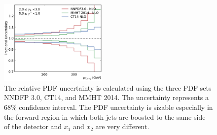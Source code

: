 \begin{figure}[htp]
    \includegraphics[width=0.47\textwidth]{figures/theory/pdf_unc_comparison_yb2ys0.pdf}
    \caption[PDF uncertainty]{The relative PDF uncertainty is calculated using the three PDF sets
    NNDFP 3.0, CT14, and MMHT 2014. The uncertainty represents a 68\% confidence
    interval. The PDF uncertainty is sizable especially in the forward region in
    which both jets  are boosted to the same side of the detector and $x_1$ and
    $x_2$ are very different.}
    \label{fig:pdf_uncertainties}
\end{figure}

